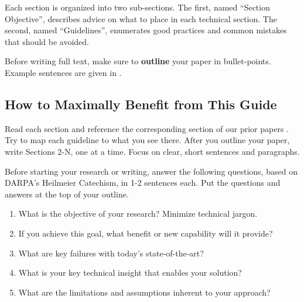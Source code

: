 Each section is organized into two sub-sections.
The first, named ``Section Objective'', describes advice on what to place in each technical section. The second, named ``Guidelines'', enumerates good practices and common mistakes that should be avoided.

Before writing full text, make sure to \textbf{outline} your paper in bullet-points.
Example sentences are given in .

\subsection{How to Maximally Benefit from This Guide}
Read each section and reference the corresponding section of our prior papers \cite{chinchali2021network,nakanoya2021task,ChinchaliSharmaEtAl2019}.
Try to map each guideline to what you see there. After you outline your paper, write Sections 2-N, one at a time. 
Focus on clear, short sentences and paragraphs. 

Before starting your research or writing, answer the following questions, based on DARPA's Heilmeier Catechism, in 1-2 sentences each. Put the questions and answers at the top of your outline.

\begin{enumerate}

\item What is the objective of your research? Minimize technical jargon.

\item If you achieve this goal, what benefit or new capability will it provide?

\item What are key failures with today's state-of-the-art?

\item What is your key technical insight that enables your solution?

\item What are the limitations and assumptions inherent to your approach?

\end{enumerate}
